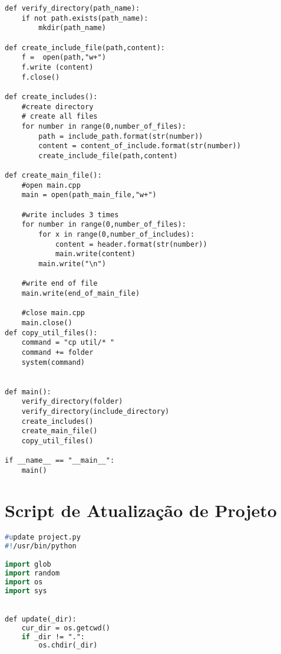 \begin{apendicesenv}
\begin{lstlisting}
def verify_directory(path_name):
    if not path.exists(path_name):
        mkdir(path_name)

def create_include_file(path,content):
    f =  open(path,"w+")
    f.write (content)
    f.close()

def create_includes():
    #create directory
    # create all files
    for number in range(0,number_of_files):
        path = include_path.format(str(number))
        content = content_of_include.format(str(number))
        create_include_file(path,content)
    
def create_main_file():
    #open main.cpp
    main = open(path_main_file,"w+")

    #write includes 3 times
    for number in range(0,number_of_files):
        for x in range(0,number_of_includes):
            content = header.format(str(number))
            main.write(content)
        main.write("\n")

    #write end of file
    main.write(end_of_main_file)

    #close main.cpp
    main.close()
def copy_util_files():                                                           
    command = "cp util/* "                                                       
    command += folder                                                            
    system(command)                                                              
                    

def main():
    verify_directory(folder)
    verify_directory(include_directory)
    create_includes()
    create_main_file()
    copy_util_files()

if __name__ == "__main__":
    main()
\end{lstlisting}

\chapter{Script de Atualização de Projeto}

\begin{lstlisting}[language=Pascal,frame=single,captionpos=b,
                                                caption={
                     Script de teste de Projeto Forward Declaration},
                                        label=script_forward_declaration]
#update project.py
#!/usr/bin/python

import glob
import random
import os
import sys


def update(_dir):
    cur_dir = os.getcwd()
    if _dir != ".":
        os.chdir(_dir)
    


\end{lstlisting}
\end{apendicesenv}
